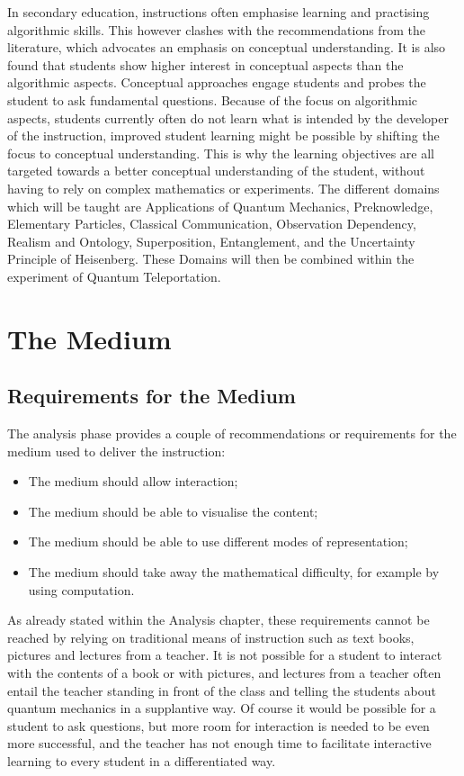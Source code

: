 \documentclass[11pt,twoside]{report} %
\begin{document}
In secondary education, instructions often emphasise learning and practising algorithmic skills. This however clashes with the recommendations from the literature, which advocates an emphasis on conceptual understanding. It is also found that students show higher interest in conceptual aspects than the algorithmic aspects. Conceptual approaches engage students and probes the student to ask fundamental questions. Because of the focus on algorithmic aspects, students currently often do not learn what is intended by the developer of the instruction, improved student learning might be possible by shifting the focus to conceptual understanding. This is why the learning objectives are all targeted towards a better conceptual understanding of the student, without having to rely on complex mathematics or experiments. The different domains which will be taught are Applications of Quantum Mechanics, Preknowledge, Elementary Particles, Classical Communication, Observation Dependency, Realism and Ontology, Superposition, Entanglement, and the Uncertainty Principle of Heisenberg. These Domains will then be combined within the experiment of Quantum Teleportation.

\chapter{The Medium}

\section{Requirements for the Medium}

The analysis phase provides a couple of recommendations or requirements for the medium used to deliver the instruction:

\begin{itemize}
\item The medium should allow interaction;
\item The medium should be able to visualise the content;
\item The medium should be able to use different modes of representation;
\item The medium should take away the mathematical difficulty, for example by using computation.
\end{itemize}

As already stated within the Analysis chapter, these requirements cannot be reached by relying on traditional means of instruction such as text books, pictures and lectures from a teacher. It is not possible for a student to interact with the contents of a book or with pictures, and lectures from a teacher often entail the teacher standing in front of the class and telling the students about quantum mechanics in a supplantive way. Of course it would be possible for a student to ask questions, but more room for interaction is needed to be even more successful, and the teacher has not enough time to facilitate interactive learning to every student in a differentiated way.
\end{document}
